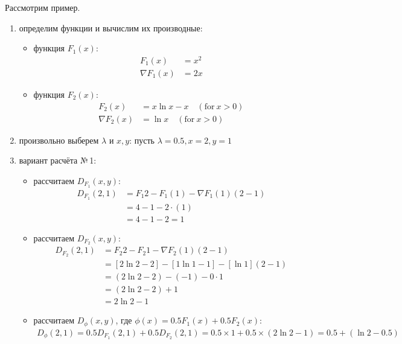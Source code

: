 \documentclass[12pt]{scrartcl}
\begin{document}
Рассмотрим пример.
\begin{enumerate}
    \item определим функции и вычислим их производные:
    \begin{itemize}
        \item функция $F_{1}(x)$:
        \begin{align*}
            F_{1}(x) &= x^{2} \\
            \nabla F_{1}(x) &= 2x
        \end{align*}
        \item функция $F_{2}(x)$:
        \begin{align*}
            F_{2}(x) &= x \ln x - x \quad (\text{for}\ x > 0)\\
            \nabla F_{2}(x) &= \ln x \quad (\text{for}\ x > 0)
        \end{align*}
    \end{itemize}
    \item произвольно выберем $\lambda$ и $x,y$: пусть $\lambda = 0.5, x = 2, y = 1$
    \item вариант расчёта №\,1:
    \begin{itemize}
        \item рассчитаем $D_{F_{1}}(x,y)$:
        \begin{align*}
            D_{F_{1}}(2,1) &= F_{1}2 - F_{1}(1) - \nabla F_{1}(1)(2 - 1) \\
            &= 4 - 1 - 2\cdot(1) \\
            &= 4 - 1 - 2 = 1
        \end{align*}
        \item рассчитаем $D_{F_{2}}(x,y)$:
        \begin{align*}
            D_{F_{2}}(2,1) &= F_{2}2 - F_{2}1 - \nabla F_{2}(1)(2 - 1) \\
            &= [2\ln 2 - 2] - [1\ln 1 -1] - [\ln 1](2 - 1) \\
            &= (2\ln 2 - 2) - (-1) - 0 \cdot 1 \\
            &= (2\ln 2 - 2) + 1\\
            &= 2\ln 2 -1
        \end{align*}
        \item рассчитаем $D_{\phi}(x,y)$, где $\phi(x) = 0.5F_{1}(x) + 0.5F_{2}(x)$:
        \begin{align*}
            D_{\phi}(2,1) = 0.5D_{F_{1}}(2,1) + 0.5D_{F_{2}}(2,1) = 0.5 \times 1 + 0.5 \times (2\ln 2 - 1) = 0.5 + (\ln 2 - 0.5)
        \end{align*}

\end{itemize}
\end{enumerate}
\end{document}
